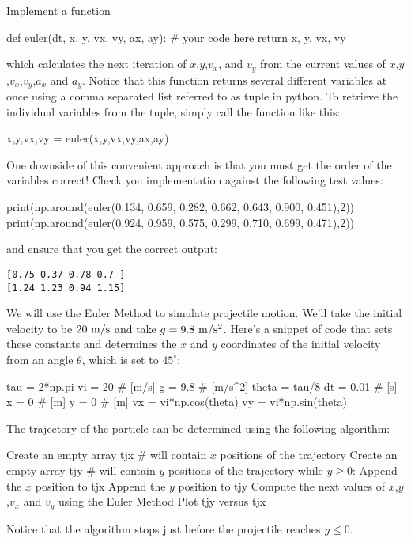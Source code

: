 \plot  Implement a function 
\begin{python}
def euler(dt, x, y, vx, vy, ax, ay):
    # your code here
    return x, y, vx, vy
\end{python}
which calculates the next iteration of $x$,$y$,$v_x$, and $v_y$ from
the current values of $x$,$y$,$v_x$,$v_y$,$a_x$ and $a_y$.  Notice that this function returns several different variables at once using a comma separated list referred to as tuple in python.  To retrieve the individual variables from the tuple, simply call the function like this:
\begin{python}
x,y,vx,vy = euler(x,y,vx,vy,ax,ay)
\end{python}
One downside of this convenient approach is that you must get the order of the variables correct!
Check you implementation against the following test values:
\begin{python}
print(np.around(euler(0.134, 0.659, 0.282, 0.662, 0.643, 0.900, 0.451),2))
print(np.around(euler(0.924, 0.959, 0.575, 0.299, 0.710, 0.699, 0.471),2))
\end{python}
and ensure that you get the correct output:
\begin{verbatim}
[0.75 0.37 0.78 0.7 ]
[1.24 1.23 0.94 1.15]
\end{verbatim}

We will use the Euler Method to simulate projectile motion.  We'll
take the initial velocity to be $20~\rm m/s$ and take $g=9.8~\rm
m/s^2$.  Here's a snippet of code that sets these constants and
determines the $x$ and $y$ coordinates of the initial velocity from an
angle $\theta$, which is set to $45^\circ$:
\begin{python}
tau = 2*np.pi
vi    = 20   # [m/s]
g     = 9.8  # [m/s^2]
theta = tau/8
dt = 0.01 # [s] 
x  = 0    # [m]
y  = 0    # [m]
vx = vi*np.cos(theta)
vy = vi*np.sin(theta)
\end{python}
The trajectory of the particle can be determined using the following algorithm:
\begin{algorithm}
  Create an empty array tjx # will contain $x$ positions of the trajectory
  Create an empty array tjy # will contain $y$ positions of the trajectory
  while $y \geq 0$:
     Append the $x$ position to tjx
     Append the $y$ position to tjy
     Compute the next values of $x$,$y$,$v_x$ and $v_y$ using the Euler Method
  Plot tjy versus tjx
\end{algorithm} 
Notice that the algorithm stops just before the projectile reaches $y \leq 0$.\\

